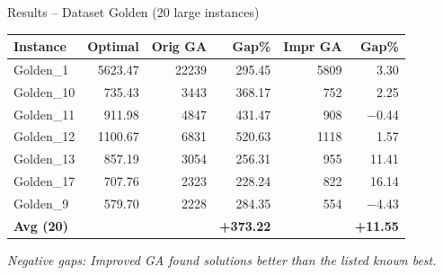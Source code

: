 \documentclass[aspectratio=169]{beamer}
\begin{document}
\begin{frame}{Results -- Dataset Golden (20 large instances)}
  \begin{center}
  \small
  \begin{tabular}{lrrrrr}
    \toprule
    Instance   & Optimal  & Orig GA & Gap\%  & Impr GA & Gap\%  \\
    \midrule
    Golden\_1  & 5623.47  & 22239   & 295.45 & 5809    & 3.30   \\
    Golden\_10 &  735.43  &  3443   & 368.17 &  752    & 2.25   \\
    Golden\_11 &  911.98  &  4847   & 431.47 &  908    & $-$0.44 \\
    Golden\_12 & 1100.67  &  6831   & 520.63 & 1118    & 1.57   \\
    Golden\_13 &  857.19  &  3054   & 256.31 &  955    & 11.41  \\
    Golden\_17 &  707.76  &  2323   & 228.24 &  822    & 16.14  \\
    Golden\_9  &  579.70  &  2228   & 284.35 &  554    & $-$4.43 \\
    \midrule
    \textbf{Avg (20)} & & & \textbf{+373.22} & & \textbf{+11.55} \\
    \bottomrule
  \end{tabular}
  \end{center}
  \vspace{2pt}
  \textit{\small Negative gaps: Improved GA found solutions better than the listed known best.}
\end{frame}
\end{document}
